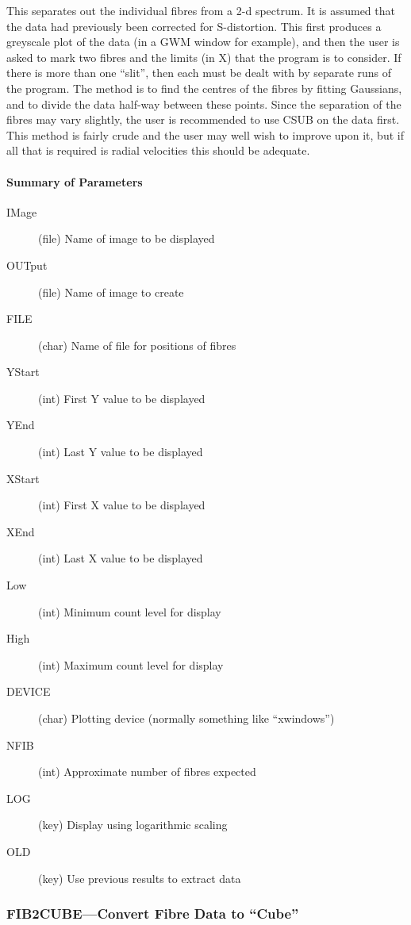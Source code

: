 This separates out the individual fibres from a 2-d spectrum. It is
assumed that the data had previously been corrected for S-distortion.
This first produces a greyscale plot of the data (in a GWM window for
example), and then the user is asked to mark two fibres and the limits
(in X) that the program is to consider.
If there is more than one ``slit'', then each must be dealt with by
separate runs of the program.
The method is to find the centres of the fibres by fitting Gaussians,
and to divide the data half-way between these points. Since the
separation of the fibres may vary slightly, the user is recommended
to use CSUB on the data first. This method is fairly crude and the user
may well wish to improve upon it, but if all that is required is radial
velocities this should be adequate.

\paragraph{Summary of Parameters}

\begin{description}
\item[IMage] (file) Name of image to be displayed 
\item[OUTput] (file) Name of image to create
\item[FILE] (char) Name of file for positions of fibres
\item[YStart] (int) First Y value to be displayed 
\item[YEnd] (int) Last Y value to be displayed 
\item[XStart] (int) First X value to be displayed 
\item[XEnd] (int) Last X value to be displayed 
\item[Low] (int) Minimum count level for display 
\item[High] (int) Maximum count level for display 
\item[DEVICE] (char) Plotting device (normally something like ``xwindows'')
\item[NFIB] (int) Approximate number of fibres expected
\item[LOG] (key) Display using logarithmic scaling 
\item[OLD] (key) Use previous results to extract data
\end{description}

\subsubsection{FIB2CUBE---Convert Fibre Data to ``Cube''}

